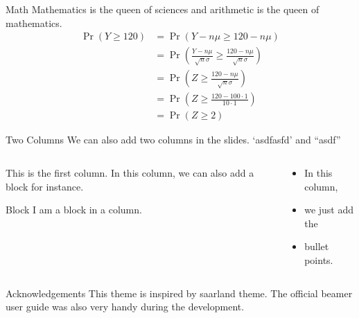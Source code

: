 \documentclass[aspectratio=169]{beamer}
\begin{document}
	\begin{frame}{Math}
		Mathematics is the queen of sciences and arithmetic is the queen of mathematics.
		\begin{align*}
			\Pr(Y \geq 120) &= \Pr\left(Y-n\mu \geq 120-n\mu \right)\\
			&= \Pr\left( \frac{Y-n\mu }{\sqrt{n}\sigma} \geq \frac{120-n\mu }{\sqrt{n}\sigma} \right)\\
			&=\Pr\left( Z \geq \frac{120-n\mu }{\sqrt{n}\sigma} \right)\\
			&=\Pr\left( Z \geq \frac{120-100 \cdot 1 }{10 \cdot 1} \right)\\
			&=\Pr\left( Z \geq 2\right)
		\end{align*}
	\end{frame}

	\begin{frame}{Two Columns}
		We can also add two columns in the slides. `asdfasfd' and ``asdf''
 		\begin{columns}[t]
			\begin{column}[T]{0.4\textwidth}
				This is the first column. In this column, we can also add a block for instance.
				\vspace{1em}
				\begin{block}{Block}
					I am a block in a column.
				\end{block}
			\end{column}
			\begin{column}[T]{0.4\textwidth}
				\begin{itemize}
					\item In this column,
					\item we just add the
					\item bullet points.
				\end{itemize}
			\end{column}
		\end{columns}
	\end{frame}
	\begin{frame}{Acknowledgements}
		This theme is inspired by saarland theme. The official beamer user guide was also very handy during the development.
	\end{frame}
\end{document}

